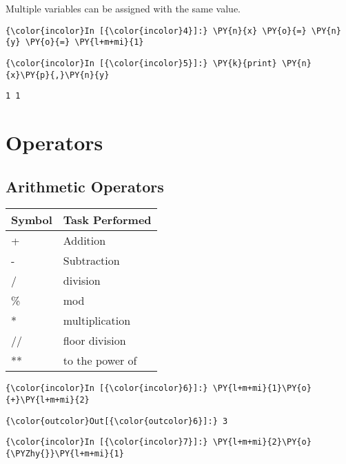     Multiple variables can be assigned with the same value.

    \begin{Verbatim}[commandchars=\\\{\}]
{\color{incolor}In [{\color{incolor}4}]:} \PY{n}{x} \PY{o}{=} \PY{n}{y} \PY{o}{=} \PY{l+m+mi}{1}
\end{Verbatim}

    \begin{Verbatim}[commandchars=\\\{\}]
{\color{incolor}In [{\color{incolor}5}]:} \PY{k}{print} \PY{n}{x}\PY{p}{,}\PY{n}{y}
\end{Verbatim}

    \begin{Verbatim}[commandchars=\\\{\}]
1 1
    \end{Verbatim}

    \section{Operators}\label{operators}

    \subsection{Arithmetic Operators}\label{arithmetic-operators}

    \begin{longtable}[c]{@{}ll@{}}
\toprule
Symbol & Task Performed\tabularnewline
\midrule
\endhead
+ & Addition\tabularnewline
- & Subtraction\tabularnewline
/ & division\tabularnewline
\% & mod\tabularnewline
* & multiplication\tabularnewline
// & floor division\tabularnewline
** & to the power of\tabularnewline
\bottomrule
\end{longtable}

    \begin{Verbatim}[commandchars=\\\{\}]
{\color{incolor}In [{\color{incolor}6}]:} \PY{l+m+mi}{1}\PY{o}{+}\PY{l+m+mi}{2}
\end{Verbatim}

            \begin{Verbatim}[commandchars=\\\{\}]
{\color{outcolor}Out[{\color{outcolor}6}]:} 3
\end{Verbatim}
        
    \begin{Verbatim}[commandchars=\\\{\}]
{\color{incolor}In [{\color{incolor}7}]:} \PY{l+m+mi}{2}\PY{o}{\PYZhy{}}\PY{l+m+mi}{1}
\end{Verbatim}

